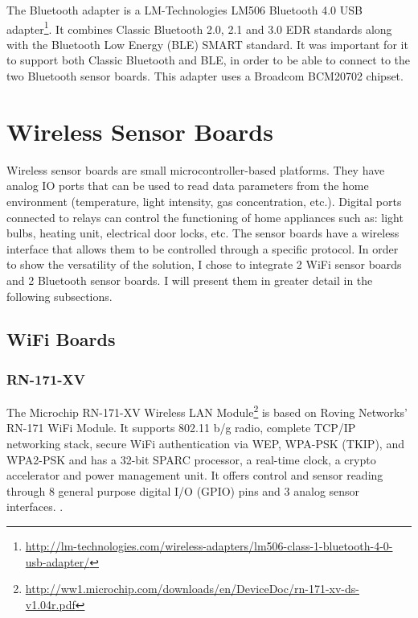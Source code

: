 The Bluetooth adapter is a LM-Technologies LM506 Bluetooth 4.0 USB adapter\footnote{\url{http://lm-technologies.com/wireless-adapters/lm506-class-1-bluetooth-4-0-usb-adapter/}}. It combines Classic Bluetooth 2.0, 2.1 and 3.0 EDR standards along with the Bluetooth Low Energy (BLE) SMART standard. It was important for it to support both Classic Bluetooth and BLE, in order to be able to connect to the two Bluetooth sensor boards. This adapter uses a Broadcom BCM20702 chipset.

\section{Wireless Sensor Boards}
\label{sec:wireless-sensor-boards}

Wireless sensor boards are small microcontroller-based platforms. They have analog IO ports that can be used to read data parameters from the home environment (temperature, light intensity, gas concentration, etc.). Digital ports connected to relays can control the functioning of home appliances such as: light bulbs, heating unit, electrical door locks, etc. The sensor boards have a wireless interface that allows them to be controlled through a specific protocol. In order to show the versatility of the solution, I chose to integrate 2 WiFi sensor boards and 2 Bluetooth sensor boards. I will present them in greater detail in the following subsections.

\subsection{WiFi Boards}

\subsubsection{RN-171-XV}
\label{sub-sub-sec:RN-171-XV}

The Microchip RN-171-XV Wireless LAN Module\footnote{\url{http://ww1.microchip.com/downloads/en/DeviceDoc/rn-171-xv-ds-v1.04r.pdf}} is based on Roving Networks' RN-171 WiFi Module. It supports 802.11 b/g radio, complete TCP/IP networking stack, secure WiFi authentication via WEP, WPA-PSK (TKIP), and WPA2-PSK and has a 32-bit SPARC processor, a real-time clock, a crypto accelerator and power management unit. It offers control and sensor reading through 8 general purpose digital I/O (GPIO) pins and 3 analog sensor interfaces. . 

